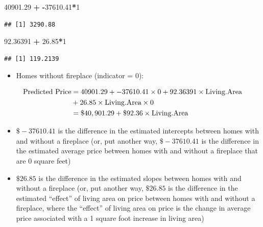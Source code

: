 \documentclass[
]{book}
\newenvironment{Shaded}{\begin{snugshade}}{\end{snugshade}}
\newcommand{\DecValTok}[1]{\textcolor[rgb]{0.00,0.00,0.81}{#1}}
\newcommand{\FloatTok}[1]{\textcolor[rgb]{0.00,0.00,0.81}{#1}}
\newcommand{\SpecialCharTok}[1]{\textcolor[rgb]{0.81,0.36,0.00}{\textbf{#1}}}
\providecommand{\tightlist}{%
  \setlength{\itemsep}{0pt}\setlength{\parskip}{0pt}}
\begin{document}
\begin{Shaded}
\begin{Highlighting}[]
\FloatTok{40901.29} \SpecialCharTok{+} \SpecialCharTok{{-}}\FloatTok{37610.41}\SpecialCharTok{*}\DecValTok{1}
\end{Highlighting}
\end{Shaded}

\begin{verbatim}
## [1] 3290.88
\end{verbatim}

\begin{Shaded}
\begin{Highlighting}[]
\FloatTok{92.36391} \SpecialCharTok{+} \FloatTok{26.85}\SpecialCharTok{*}\DecValTok{1}
\end{Highlighting}
\end{Shaded}

\begin{verbatim}
## [1] 119.2139
\end{verbatim}

\begin{itemize}
\tightlist
\item
  Homes without fireplace (indicator = 0):
\end{itemize}

\begin{align*}
\hbox{Predicted Price} &= 40901.29 + -37610.41 \times 0 + 92.36391 \times \hbox{Living.Area}\\
&+ 26.85 \times \hbox{Living.Area} \times 0 \\
&= \$40,901.29 + \$92.36 \times \hbox{Living.Area}
\end{align*}

\begin{itemize}
\tightlist
\item
  \(\$-37610.41\) is the difference in the estimated intercepts between homes with and without a fireplace (or, put another way, \(\$-37610.41\) is the difference in the estimated average price between homes with and without a fireplace that are 0 square feet)
\item
  \(\$26.85\) is the difference in the estimated slopes between homes with and without a fireplace (or, put another way, \(\$26.85\) is the difference in the estimated ``effect'' of living area on price between homes with and without a fireplace, where the ``effect'' of living area on price is the change in average price associated with a 1 square foot increase in living area)
\end{itemize}
\end{document}
